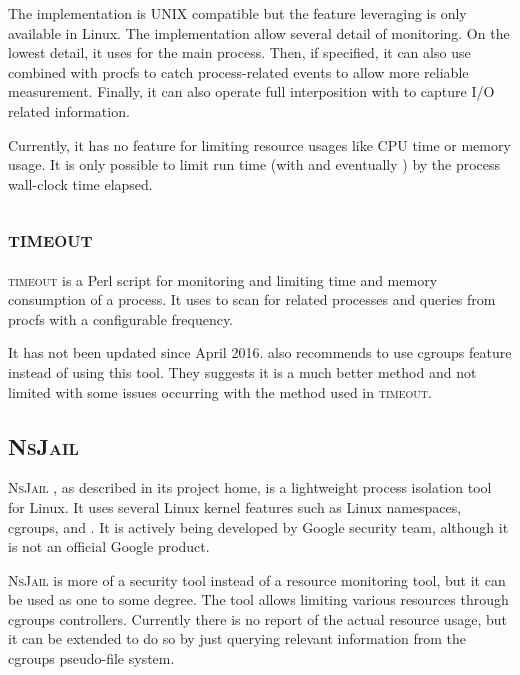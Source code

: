 The implementation is UNIX compatible but the feature leveraging  is only available in Linux.
The implementation allow several detail of monitoring.
On the lowest detail, it uses  for the main process.
Then, if specified, it can also use  combined with procfs to catch process-related events to allow more reliable measurement.
Finally, it can also operate full interposition with  to capture I/O related information.

Currently, it has no feature for limiting resource usages like CPU time or memory usage.
It is only possible to limit run time (with  and eventually ) by the process wall-clock time elapsed.


\subsection{\textsc{timeout}}

\textsc{timeout} \citep{shvedScriptMeasureLimit2019} is a Perl script for monitoring and limiting time and memory consumption of a process.
It uses  \citep[ps(1)]{manpages} to scan for related processes and queries from procfs with a configurable frequency.

It has not been updated since April 2016.
\citeauthor{shvedScriptMeasureLimit2019} also recommends to use cgroups feature instead of using this tool.
They suggests it is a much better method and not limited with some issues occurring with the method used in \textsc{timeout}.

\subsection{\textsc{NsJail}}
\label{sec:resource.impl.nsjail}

\textsc{NsJail} \citep{LightweightProcessIsolation2019}, as described in its project home, is a lightweight process isolation tool for Linux.
It uses several Linux kernel features such as Linux namespaces, cgroups, and .
It is actively being developed by Google security team, although it is not an official Google product.

\textsc{NsJail} is more of a security tool instead of a resource monitoring tool, but it can be used as one to some degree.
The tool allows limiting various resources through cgroups controllers.
Currently there is no report of the actual resource usage, but it can be extended to do so by just querying relevant information from the cgroups pseudo-file system.

